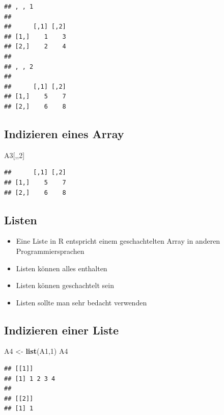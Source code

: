 \documentclass[]{article}
\newenvironment{Shaded}{\begin{snugshade}}{\end{snugshade}}
\newcommand{\KeywordTok}[1]{\textcolor[rgb]{0.13,0.29,0.53}{\textbf{{#1}}}}
\newcommand{\DecValTok}[1]{\textcolor[rgb]{0.00,0.00,0.81}{{#1}}}
\newcommand{\StringTok}[1]{\textcolor[rgb]{0.31,0.60,0.02}{{#1}}}
\newcommand{\NormalTok}[1]{{#1}}
\providecommand{\tightlist}{%
  \setlength{\itemsep}{0pt}\setlength{\parskip}{0pt}}
\begin{document}
\begin{verbatim}
## , , 1
## 
##      [,1] [,2]
## [1,]    1    3
## [2,]    2    4
## 
## , , 2
## 
##      [,1] [,2]
## [1,]    5    7
## [2,]    6    8
\end{verbatim}

\subsection{Indizieren eines Array}\label{indizieren-eines-array}

\begin{Shaded}
\begin{Highlighting}[]
\NormalTok{A3[,,}\DecValTok{2}\NormalTok{]}
\end{Highlighting}
\end{Shaded}

\begin{verbatim}
##      [,1] [,2]
## [1,]    5    7
## [2,]    6    8
\end{verbatim}

\subsection{Listen}\label{listen}

\begin{itemize}
\tightlist
\item
  Eine Liste in R entspricht einem geschachtelten Array in anderen
  Programmiersprachen
\item
  Listen können alles enthalten
\item
  Listen können geschachtelt sein
\item
  Listen sollte man sehr bedacht verwenden
\end{itemize}

\subsection{Indizieren einer Liste}\label{indizieren-einer-liste}

\begin{Shaded}
\begin{Highlighting}[]
\NormalTok{A4 <-}\StringTok{ }\KeywordTok{list}\NormalTok{(A1,}\DecValTok{1}\NormalTok{)}
\NormalTok{A4}
\end{Highlighting}
\end{Shaded}

\begin{verbatim}
## [[1]]
## [1] 1 2 3 4
## 
## [[2]]
## [1] 1
\end{verbatim}
\end{document}
